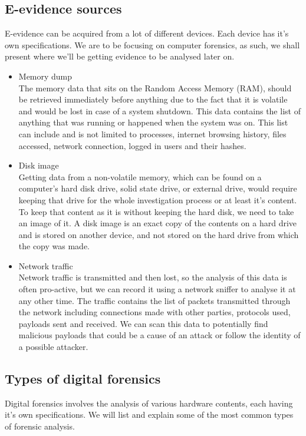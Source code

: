 \subsection{E-evidence sources}
E-evidence can be acquired from a lot of different devices. Each device has it's own specifications. We are to be focusing on computer forensics, as such, we shall present where we'll be getting evidence to be analysed later on.
\begin{itemize}
    \item Memory dump\\
    The memory data that sits on the Random Access Memory (RAM), should be retrieved immediately before anything due to the fact that it is volatile and would be lost in case of a system shutdown. This data contains the list of anything that was running or happened when the system was on. This list can include and is not limited to processes, internet browsing history, files accessed, network connection, logged in users and their hashes.
    \item Disk image\\
    Getting data from a non-volatile memory, which can be found on a computer’s hard disk drive, solid state drive, or external drive, would require keeping that drive for the whole investigation process or at least it's content. To keep that content as it is without keeping the hard disk, we need to take an image of it. A disk image is an exact copy of the contents on a hard drive and is stored on another device, and not stored on the hard drive from which the copy was made.
    \item Network traffic\\
    Network traffic is transmitted and then lost, so the analysis of this data is often pro-active, but we can record it using a network sniffer to analyse it at any other time. The traffic contains the list of packets transmitted through the network including connections made with other parties, protocols used, payloads sent and received. We can scan this data to potentially find malicious payloads that could be a cause of an attack or follow the identity of a possible attacker.
\end{itemize}

\subsection{Types of digital forensics}
Digital forensics involves the analysis of various hardware contents, each having it's own specifications. We will list and explain some of the most common types of forensic analysis.
